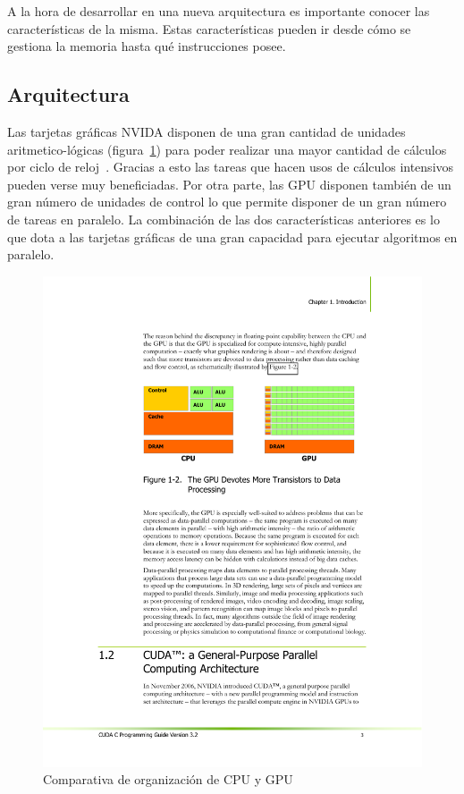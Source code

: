 A la hora de desarrollar en una nueva arquitectura es importante conocer las características de la misma. Estas características pueden ir desde cómo se gestiona la memoria hasta qué instrucciones posee.

\subsection{Arquitectura}

Las tarjetas gráficas NVIDA disponen de una gran cantidad de unidades aritmetico-lógicas (figura~\ref{fig:cudaorggpu}) para poder realizar una mayor cantidad de cálculos por ciclo de reloj~\cite{nvidia:cuda_c_programming_guide}. Gracias a esto las tareas que hacen usos de cálculos intensivos pueden verse muy beneficiadas. Por otra parte, las GPU disponen también de un gran número de unidades de control lo que permite disponer de un gran número de tareas en paralelo. La combinación de las dos características anteriores es lo que dota a las tarjetas gráficas de una gran capacidad para ejecutar algoritmos en paralelo.

\begin{figure}
	\centering
	\includegraphics[width=1\textwidth]{images/cpuvsgpu.pdf}
	\caption{Comparativa de organización de CPU y GPU \cite{nvidia:cuda_c_programming_guide}}\label{fig:cudaorggpu}
\end{figure}

